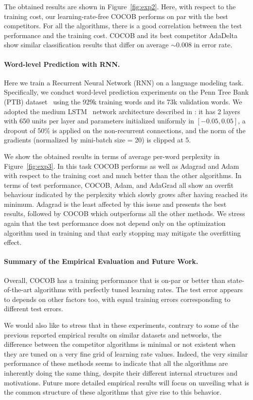 \documentclass{article}
\begin{document}
The obtained results are shown in Figure~\ref{fig:exp2}.
Here, with respect to the training cost, our learning-rate-free COCOB performs on par with the best competitors. For all the algorithms, there is a good correlation between the test performance and the training cost. COCOB and its best competitor AdaDelta show similar
classification results that differ on average $\sim 0.008$ in error rate.

\paragraph{Word-level Prediction with RNN.}
Here we train a Recurrent Neural Network (RNN) on a language modeling task. 
Specifically, we conduct word-level prediction experiments on the Penn Tree Bank (PTB) dataset~\citep{MarcusMS93} 
using the 929k training words and its 73k validation words. We adopted the medium LSTM~\citep{HochreiterS97} network 
architecture described in \citet{ZarembaSV14}: it has 2 layers with 650 units per layer and parameters
initialized uniformly in $[-0.05, 0.05]$, a dropout of 50\% is applied on the non-recurrent connections,
and the norm of the gradients (normalized by mini-batch size = 20) is clipped at 5.

We show the obtained results in terms of average per-word perplexity in Figure~\ref{fig:exp3}.
In this task COCOB performs as well as Adagrad and Adam with respect to the training cost and much better than the other
algorithms. In terms of test performance, COCOB, Adam, and AdaGrad all show an overfit behaviour 
indicated by the perplexity which slowly grows after having reached its minimum.
Adagrad is the least affected by this issue and presents the best results, followed by COCOB
which outperforms all the other methods. We stress again that the test performance does not depend only 
on the optimization algorithm used in training and that early stopping may mitigate the overfitting effect.

\paragraph{Summary of the Empirical Evaluation and Future Work.}
Overall, COCOB has a training performance that is on-par or better than state-of-the-art algorithms with perfectly tuned learning rates.
The test error appears to depends on other factors too, with equal training errors corresponding to different test errors.

We would also like to stress that in these experiments, contrary to some of the previous reported empirical results on similar datasets and networks, the difference between the competitor algorithms is minimal or not existent when they are tuned on a very fine grid of learning rate values. Indeed, the very similar performance of these methods seems to indicate that all the algorithms are inherently doing the same thing, despite their different internal structures and motivations. 
Future more detailed empirical results will focus on unveiling what is the common structure of these algorithms that give rise to this behavior.
\end{document}
